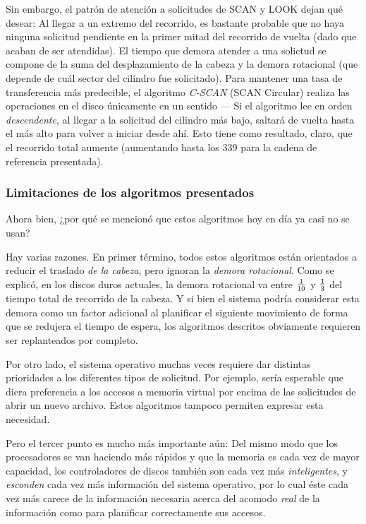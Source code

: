 \documentclass[11pt,fleqn]{book} %
\begin{document}
\begin{description}
     Sin embargo, el patrón de atención a solicitudes de SCAN y LOOK
     dejan qué desear: Al llegar a un extremo del recorrido, es
     bastante probable que no haya ninguna solicitud pendiente en la
     primer mitad del recorrido de vuelta (dado que acaban de ser
     atendidas). El tiempo que demora atender a una solictud se
     compone de la suma del desplazamiento de la cabeza y la demora
     rotacional (que depende de cuál sector del cilindro fue
     solicitado). Para mantener una tasa de transferencia más
     predecible, el algoritmo \emph{C-SCAN} (SCAN Circular) realiza las
     operaciones en el disco únicamente en un sentido — Si el
     algoritmo lee en orden \emph{descendente}, al llegar a la solicitud
     del cilindro más bajo, saltará de vuelta hasta el más alto para
     volver a iniciar desde ahí. Esto tiene como resultado, claro, que
     el recorrido total aumente (aumentando hasta los 339 para la
     cadena de referencia presentada).
\end{description}
\subsubsection{Limitaciones de los algoritmos presentados}
\label{sec-10-1-1-3}
\label{FS_FIS_limitaciones}


Ahora bien, ¿por qué se mencionó que estos algoritmos hoy en día ya
casi no se usan?

Hay varias razones. En primer término, todos estos algoritmos
están orientados a reducir el traslado \emph{de la cabeza}, pero ignoran
la \emph{demora rotacional}. Como se explicó, en los discos duros actuales, la
demora rotacional va entre $1 \over 10$ y $1 \over 3$ del tiempo
total de recorrido de la cabeza. Y si bien el sistema podría
considerar esta demora como un factor adicional al planificar el
siguiente movimiento de forma que se redujera el tiempo de espera,
los algoritmos descritos obviamente requieren ser replanteados por
completo.

Por otro lado, el sistema operativo muchas veces requiere dar
distintas prioridades a los diferentes tipos de solicitud. Por
ejemplo, sería esperable que diera preferencia a los accesos a memoria
virtual por encima de las solicitudes de abrir un nuevo archivo. Estos
algoritmos tampoco permiten expresar esta necesidad.

Pero el tercer punto es mucho más importante aún: Del mismo modo
que los procesadores se van haciendo más rápidos y que la memoria
es cada vez de mayor capacidad, los controladores de discos también
son cada vez más \emph{inteligentes}, y \emph{esconden} cada vez más
información del sistema operativo, por lo cual éste cada vez más
carece de la información necesaria acerca del acomodo \emph{real} de la
información como para planificar correctamente sus accesos.
\end{document}
